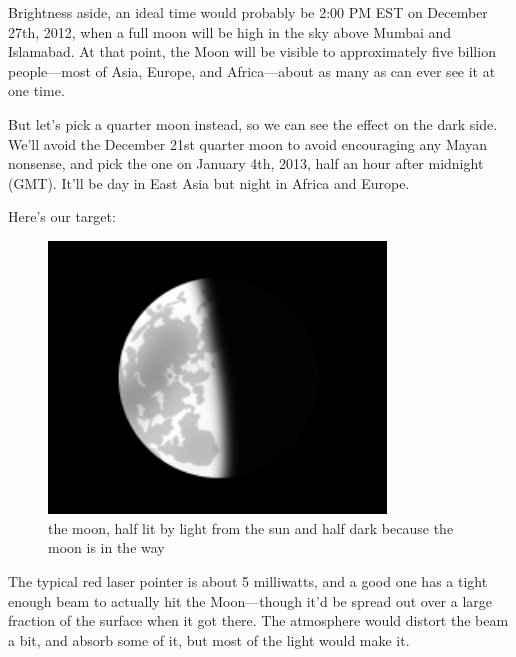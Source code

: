 {Brightness aside, an ideal time would probably be 2:00 PM EST on December 27th, 2012, when a full moon will be high in the sky above Mumbai and Islamabad. At that point, the Moon will be visible to approximately five billion people—most of Asia, Europe, and Africa—about as many as can ever see it at one time.}

{But let’s pick a quarter moon instead, so we can see the effect on the dark side. We’ll avoid the December 21st quarter moon to avoid encouraging any Mayan nonsense, and pick the one on January 4th, 2013, half an hour after midnight (GMT). It’ll be day in East Asia but night in Africa and Europe.}

{Here’s our target:}

\begin{figure}[!htbp]
\centering
\includegraphics[scale=0.5, max width=0.8\textwidth]{imgs/a/13/laser_pointer_setup.png}
\caption{the moon, half lit by light from the sun and half dark because the moon is in the way}
\end{figure}

{The typical red laser pointer is about 5 milliwatts, and a good one has a tight enough beam to actually hit the Moon—though it’d be spread out over a large fraction of the surface when it got there. The atmosphere would distort the beam a bit, and absorb some of it, but most of the light would make it.}

